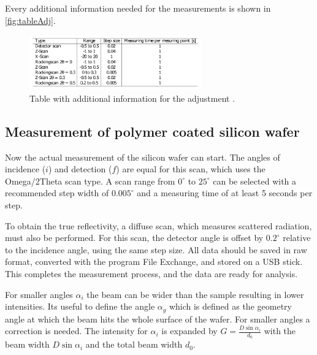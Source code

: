 Every additional information needed for the measurements is shown in \autoref{fig:tableAdj}.
\begin{figure}
	\centering
	\includegraphics[width=0.66\textwidth]{content/graphics/table.pdf}
	\caption{Table with additional information for the adjustment \cite{xray}.}
	\label{fig:tableAdj}
\end{figure}

\subsection{Measurement of polymer coated silicon wafer}

Now the actual measurement of the silicon wafer can start. The angles of incidence (\( i \)) and detection (\( f \)) are equal for this scan, which uses the Omega/2Theta scan type. A scan range from \( 0^\circ \) to \( 25^\circ \) can be selected with a recommended step width of \( 0.005^\circ \) and a measuring time of at least 5 seconds per step.

To obtain the true reflectivity, a diffuse scan, which measures scattered radiation, must also be performed. For this scan, the detector angle is offset by \( 0.2^\circ \) relative to the incidence angle, using the same step size. All data should be saved in raw format, converted with the program File Exchange, and stored on a USB stick. This completes the measurement process, and the data are ready for analysis.

For smaller angles $\alpha_i$ the beam can be wider than the sample resulting in lower intensities. Its useful to define the angle $\alpha_g$ which is defined as the geometry angle at which the beam hits the whole surface of the wafer. For smaller angles a correction is needed. The intensity for $\alpha_i$ is expanded by $G=\frac{D\sin{\alpha_i}}{d_0}$ with the beam width $D\sin{\alpha_i}$ and the total beam width $d_0$.  
